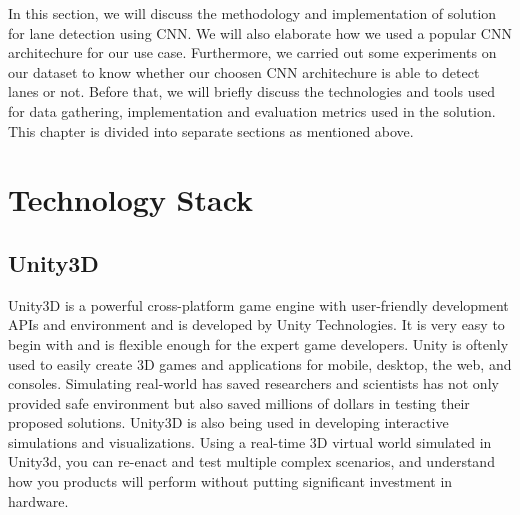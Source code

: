 
In this section, we will discuss the methodology and implementation of solution for lane detection using CNN. We will also elaborate how we used a popular CNN architechure for our use case. Furthermore, we carried out some experiments on our dataset to know whether our choosen CNN architechure is able to detect lanes or not. Before that, we will briefly discuss the technologies and tools used for data gathering, implementation and evaluation metrics used in the solution. This chapter is divided into separate sections as mentioned above.

\section{Technology Stack}
\subsection{Unity3D}\label{subsec:unity}
Unity3D is a powerful cross-platform game engine with user-friendly development APIs and environment and is developed by Unity Technologies. It is very easy to begin with and is flexible enough for the expert game developers. Unity is oftenly used to easily create 3D games and applications for mobile, desktop, the web, and consoles. Simulating real-world has saved researchers and scientists has not only provided safe environment but also saved millions of dollars in testing their proposed solutions. Unity3D is also being used in developing interactive simulations and visualizations. Using a real-time 3D virtual world simulated in Unity3d, you can re-enact and test multiple complex scenarios, and understand how you products will perform without putting significant investment in hardware.

